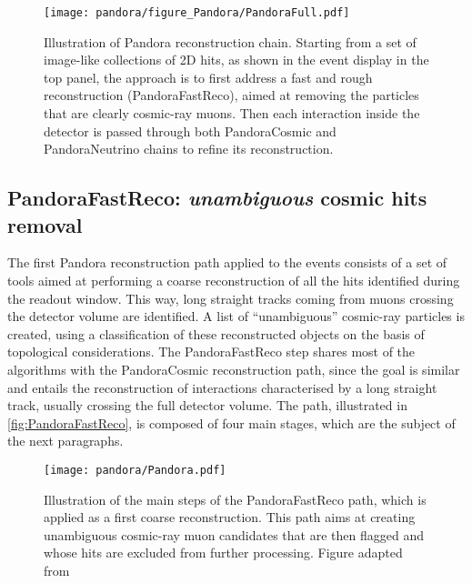\begin{figure}[p]
    \centering
    \texttt{[image: pandora/figure\_Pandora/PandoraFull.pdf]}
    \caption[Overview of Pandora reconstruction chain]{Illustration of Pandora reconstruction chain. Starting from a set of image-like collections of 2D hits, as shown in the event display in the top panel, the approach is to first address a fast and rough reconstruction (PandoraFastReco), aimed at removing the particles that are clearly cosmic-ray muons. Then each interaction inside the detector is passed through both PandoraCosmic and PandoraNeutrino chains to refine its reconstruction. }
    \label{fig:pandora}
\end{figure}

\subsection{PandoraFastReco: \emph{unambiguous} cosmic hits removal} \label{sec:fast_reco}

The first Pandora reconstruction path applied to the events consists of a set of tools aimed at performing a coarse reconstruction of all the hits identified during the readout window. This way, long straight tracks coming from muons crossing the detector volume are identified. A list of ``unambiguous'' cosmic-ray particles is created, using a classification of these reconstructed objects on the basis of topological considerations. The PandoraFastReco step shares most of the algorithms with the PandoraCosmic reconstruction path, since the goal is similar and entails the reconstruction of interactions characterised by a long straight track, usually crossing the full detector volume. The path, illustrated in \autoref{fig:PandoraFastReco}, is composed of four main stages, which are the subject of the next paragraphs. 

\begin{figure}
    \centering
    \texttt{[image: pandora/Pandora.pdf]}
    \caption[PandoraFastReco path illustration]{Illustration of the main steps of the PandoraFastReco path, which is applied as a first coarse reconstruction. This path aims at creating unambiguous cosmic-ray muon candidates that are then flagged and whose hits are excluded from further processing. Figure adapted from \cite{MicroBooNE:2017xvs}}
    \label{fig:PandoraFastReco}
\end{figure}

